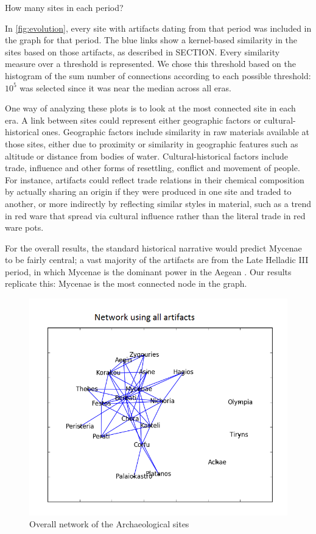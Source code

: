   How many sites in each period?
  
In \cref{fig:evolution}, every site with artifacts dating from that period was included in the graph for that period. The blue links show a kernel-based similarity in the sites based on those artifacts, as described in SECTION. Every similarity measure over a threshold is represented. We chose this threshold based on the histogram of the sum number of connections according to each possible threshold: $10^{5}$ was selected since it was near the median across all eras.

One way of analyzing these plots is to look at the most connected site in each era. A link between sites could represent either geographic factors or cultural-historical ones. Geographic factors include similarity in raw materials available at those sites, either due to proximity or similarity in geographic features such as altitude or distance from bodies of water. Cultural-historical factors include trade, influence and other forms of resettling, conflict and movement of people. For instance, artifacts could reflect trade relations in their chemical composition by actually sharing an origin if they were produced in one site and traded to another, or more indirectly by reflecting similar styles in material, such as a trend in red ware that spread via cultural influence rather than the literal trade in red ware pots. 
 
  
  
For the overall results, the standard historical narrative would predict Mycenae to be fairly central; a vast majority of the artifacts are from the Late Helladic III period, in which Mycenae is the dominant power in the Aegean \cite{demand2011mediterranean}. Our results replicate this: Mycenae is the most connected node in the graph. 



\begin{figure}
\includegraphics[width=\textwidth]{Overall_Network.png}
\caption{Overall network of the Archaeological sites}
\label{fig:overall}
\end{figure}


